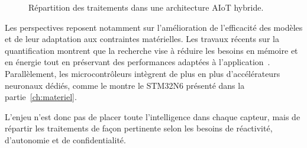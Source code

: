 \begin{figure}[H]
\centering
{}
\caption{Répartition des traitements dans une architecture AIoT hybride.}
\label{fig:hybride}
\end{figure}

Les perspectives reposent notamment sur l'amélioration de l'efficacité des
modèles et de leur adaptation aux contraintes matérielles. Les travaux récents
sur la quantification montrent que la recherche vise à réduire les besoins en
mémoire et en énergie tout en préservant des performances adaptées à
l'application~\cite{gholami2021survey}. Parallèlement, les microcontrôleurs
intègrent de plus en plus d'accélérateurs neuronaux dédiés, comme le montre le
STM32N6 présenté dans la partie~\ref{ch:materiel}.

L'enjeu n'est donc pas de placer toute l'intelligence dans chaque capteur, mais
de répartir les traitements de façon pertinente selon les besoins de
réactivité, d'autonomie et de confidentialité.
